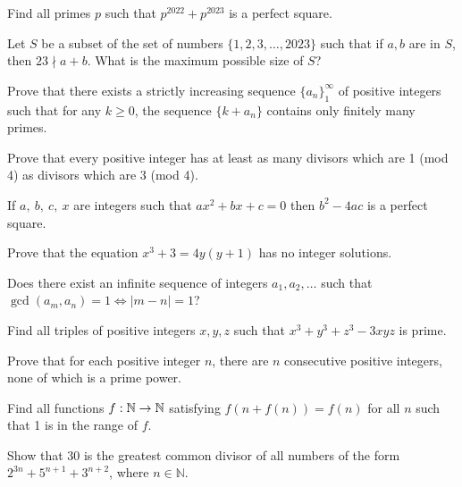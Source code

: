 \begin{problem}{\label{p:n:n:pr:46}}
    Find all primes $p$ such that $p^{2022}+p^{2023}$ is a perfect square.
\end{problem}
\begin{problem}{\label{p:n:n:pr:47}}
    Let $S$ be a subset of the set of numbers $\{1, 2, 3,\ldots, 2023\}$
    such that if $a,b$ are in $S$, then $23\nmid a+b$. What is the maximum
    possible size of $S$?
\end{problem}
\begin{problem}{\label{p:n:n:pr:48}}
  Prove that there exists a strictly increasing sequence $\{a_n\}_1^\infty$
    of positive integers such that for any $k\ge 0$, the sequence $\{k+a_n\}$
    contains only finitely many primes.
\end{problem}
\begin{problem}{\label{p:n:n:pr:49}}
    Prove that every positive integer has at least as many divisors which
    are 1 (mod 4) as divisors which are 3 (mod 4).
\end{problem}
\begin{result}{\label{r:n:n:pr:3}}
    If $a,\ b,\ c,\ x$ are integers such that $ax^2+bx+c=0$ then $b^2-4ac$ is a
    perfect square.
\end{result}
\begin{problem}{\label{p:n:n:pr:50}}
  Prove that the equation $x^3+3=4y(y+1)$ has no integer solutions.
\end{problem}
\begin{problem}{\label{p:n:n:pr:51}}
  Does there exist an infinite sequence of integers $a_1,a_2,\ldots$ such
    that $\gcd(a_m,a_n)=1\iff |m-n|=1$?
\end{problem}
\begin{problem}{\label{p:n:n:pr:52}}
  Find all triples of positive integers $x, y, z$ such that
      $x^3+y^3+z^3-3xyz$ is prime.
\end{problem}
\begin{problem}{\label{p:n:n:pr:53}}
  Prove that for each positive integer $n$, there are $n$ consecutive
    positive integers, none of which is a prime power.
\end{problem}
\begin{problem}{\label{p:n:n:pr:54}}
  Find all functions $f:\mathbb{N}\to\mathbb{N}$ satisfying $f(n+f(n))=f(n)$ for all
    $n$ such that 1 is in the range of $f$.
\end{problem}
\begin{problem}{\label{p:n:n:pr:55}}
  Show that $30$ is the greatest common divisor of all numbers of the form
    $2^{3n}+5^{n+1}+3^{n+2}$, where $n \in \mathbb{N}$.
\end{problem}
